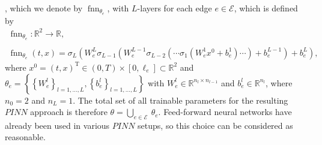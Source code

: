 , which we denote by $\operatorname{fnn}_{\theta_e}$, with $L$-layers for each edge $e \in \mathcal{E}$, which is defined by 
\begin{equation} 
    \label{one_for_each}
    \begin{gathered}
        \operatorname{fnn}_{\theta_e} \colon \mathbb{R}^2 \to \mathbb{R}, \\
        \\
        \operatorname{fnn}_{\theta_e}\left(t, x\right) = \sigma_L\left(W^L_e \sigma_{L-1}\left(W^{L-1}_e\sigma_{L-2}\left(\cdots \sigma_{1}\left(W^{1}_e x^0 +b^1_e\right) \cdots\right) + b^{L-1}_e\right) + b^{L}_e\right),
    \end{gathered} 
\end{equation} 
where $x^0 = \left(t, x\right)^{\mathrm{T}} \in \left(0, T\right) \times \left[0, \ell_e\right] \subset \mathbb{R}^2$ and $\theta_e = \left\{ \left\{ W^l_e \right\}_{l = 1, \ldots, L}, \left\{ b^l_e \right\}_{l = 1, \ldots, L} \right\}$ with $W^l_e \in \mathbb{R}^{n_l \times n_{l-1}}$ and $b^l_e \in \mathbb{R}^{n_l}$, where $n_0 = 2$ and $n_L = 1$. The total set of all trainable parameters for the resulting $PINN$ approach is therefore $\theta = \bigcup_{e \in \mathcal{E}} \ \theta_e$. Feed-forward neural networks have already been used in various $PINN$ setups, so this choice can be considered as reasonable. \\

